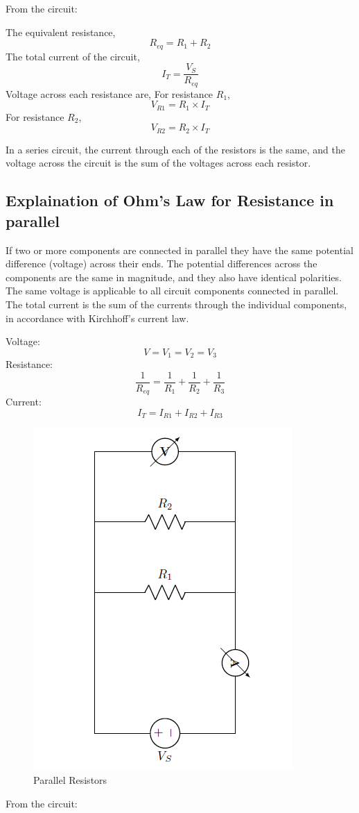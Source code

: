 			From the circuit:
			
			The equivalent resistance,
			$$R_{eq}=R_1+R_2$$
			The total current of the circuit,
			$$I_T=\frac{V_S}{R_{eq}}$$
			Voltage across each resistance are,
			For resistance \(R_1\),
			$$V_{R1}=R_1 \times I_T$$
			For resistance \(R_2\),
			$$V_{R2}=R_2 \times I_T$$
			
			In a series circuit, the current through each of the resistors is the same, and the voltage across the circuit is the sum of the voltages across each resistor.
			
		\subsection{Explaination of Ohm's Law for Resistance in parallel}
			If two or more components are connected in parallel they have the same potential difference (voltage) across their ends. The potential differences across the components are the same in magnitude, and they also have identical polarities. The same voltage is applicable to all circuit components connected in parallel. The total current is the sum of the currents through the individual components, in accordance with Kirchhoff’s current law.
			
			Voltage:
			$$V=V_1=V_2=V_3$$
			Resistance:
			$$\frac{1}{R_{eq}}=\frac{1}{R_1}+\frac{1}{R_2}+\frac{1}{R_3}$$
			Current:
			$$I_T=I_{R1}+I_{R2}+I_{R3}$$
			\begin{figure}[h]
				\centering
				\includegraphics[width=0.5\linewidth]{img/exp4/3}
				\caption{Parallel Resistors}
				\label{fig:parallelResistors}
			\end{figure}
		
			From the circuit:
			
